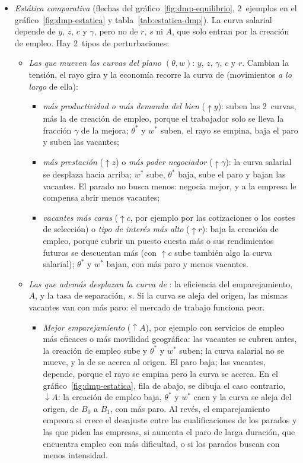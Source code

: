 \documentclass[11pt]{article}
\begin{document}
\begin{itemize}
\item \emph{Estática comparativa} (flechas del gráfico~\ref{fig:dmp-equilibrio}, 2~ejemplos en el gráfico~\ref{fig:dmp-estatica} y tabla~\ref{tab:estatica-dmp}). La curva salarial depende de $y$, $z$, $c$ y $\gamma$, pero no de $r$, $s$ ni $A$, que solo entran por la creación de empleo. Hay 2~tipos de perturbaciones:
  \begin{itemize}
  \item \emph{Las que mueven las curvas del plano $(\theta,w)$}: $y$, $z$, $\gamma$, $c$ y $r$. Cambian la tensión, el rayo gira y la economía recorre la curva de  (movimientos \emph{a lo largo} de ella):
    \begin{itemize}
    \item \emph{más productividad o más demanda del bien} ($\uparrow y$): suben las 2~curvas, más la de creación de empleo, porque el trabajador solo se lleva la fracción $\gamma$ de la mejora; $\theta^*$ y $w^*$ suben, el rayo se empina, baja el paro y suben las vacantes;
    \item \emph{más prestación} ($\uparrow z$) o \emph{más poder negociador} ($\uparrow\gamma$): la curva salarial se desplaza hacia arriba; $w^*$ sube, $\theta^*$ baja, sube el paro y bajan las vacantes. El parado no busca menos: negocia mejor, y a la empresa le compensa abrir menos vacantes;
    \item \emph{vacantes más caras} ($\uparrow c$, por ejemplo por las cotizaciones o los costes de selección) o \emph{tipo de interés más alto} ($\uparrow r$): baja la creación de empleo, porque cubrir un puesto cuesta más o sus rendimientos futuros se descuentan más (con $\uparrow c$ sube también algo la curva salarial); $\theta^*$ y $w^*$ bajan, con más paro y menos vacantes.
    \end{itemize}
  \item \emph{Las que además desplazan la curva de }: la eficiencia del emparejamiento, $A$, y la tasa de separación, $s$. Si la curva se aleja del origen, las mismas vacantes van con más paro: el mercado de trabajo funciona peor.
    \begin{itemize}
    \item \emph{Mejor emparejamiento} ($\uparrow A$), por ejemplo con servicios de empleo más eficaces o más movilidad geográfica: las vacantes se cubren antes, la creación de empleo sube y $\theta^*$ y $w^*$ suben; la curva salarial no se mueve, y la de  se acerca al origen. El paro baja; las vacantes, depende, porque el rayo se empina pero la curva se acerca. En el gráfico~\ref{fig:dmp-estatica}, fila de abajo, se dibuja el caso contrario, $\downarrow A$: la creación de empleo baja, $\theta^*$ y $w^*$ caen y la curva se aleja del origen, de $B_0$ a $B_1$, con más paro. Al revés, el emparejamiento empeora si crece el desajuste entre las cualificaciones de los parados y las que piden las empresas, si aumenta el paro de larga duración, que encuentra empleo con más dificultad, o si los parados buscan con menos intensidad.

\end{itemize}
\end{itemize}
\end{itemize}
\end{document}
